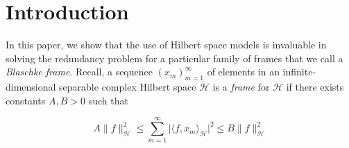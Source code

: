 \documentclass[10pt, reqno]{amsart}
\theoremstyle{definition}
\numberwithin{equation}{section}
\begin{document}
\begin{abstract}
    \noindent For a finite Blaschke product $B$ and for an isometry $V$ on 
an infinite-dimensional separable complex Hilbert space $\mathcal{H}$ we study a sequence $(b_m)_{m=1}^\infty$ of vectors in $\mathcal{H}$, defined by $b_m = B(V^*)e_m$, where $(e_m)_{m=1}^\infty$ is an orthonormal basis in $\mathcal{H}$. We call $(b_m)_{m=1}^\infty$ a Blaschke frame for $B$ with isometry $V$ on $\mathcal{H}$. We show how instrumental the use of Hilbert space models are in frame theory by completely solving the question of redundancy for a Blaschke frame, that is, what vectors can be removed from the frame $(b_{m})_{m=1}^{\infty}$ such that $(b_{m})_{m\neq k}$ is still a frame? Using the Wold decomposition, we prove that a Blaschke frame can have no redundant vectors (a Riesz basis), finitely many or infinitely many redundant vectors. These unique cases depend on the choice of finite Blaschke product and which isometry one chooses in the construction of a Blaschke frame. 


\end{abstract} \maketitle




\section{Introduction}

In this paper, we show that the use of Hilbert space models is invaluable in solving the redundancy problem for a particular family of frames that we call a {\it{Blaschke frame}}. Recall, a sequence $(x_{m})_{m=1}^{\infty}$ of elements in an infinite-dimensional separable complex Hilbert space $\mathcal{H}$ is a {\it{frame}} for $\mathcal{H}$ if there exists constants $A,B>0$ such that 

\begin{equation}\label{framedefeq}
A\|f\|_{\mathcal{H}}^{2} \leq \sum_{m=1}^{\infty}\lvert\langle f,x_{m}\rangle_{\mathcal{H}}\rvert^{2}\leq B\|f\|_{\mathcal{H}}^{2}
\end{equation}
\end{document}
